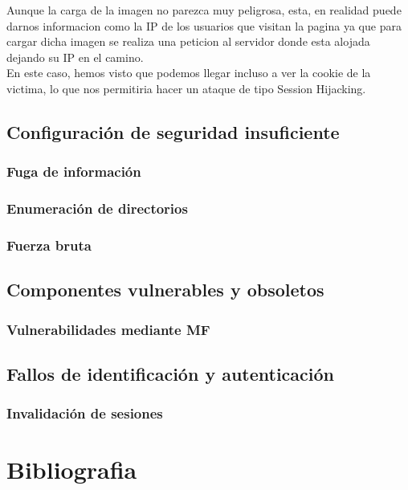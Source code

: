 \documentclass{report}
\begin{document}
                Aunque la carga de la imagen no parezca muy peligrosa, esta, en realidad puede darnos informacion como la IP de los usuarios que visitan la pagina ya que para cargar dicha imagen se realiza una peticion al servidor donde esta alojada dejando su IP en el camino.\\

                En este caso, hemos visto que podemos llegar incluso a ver la cookie de la victima, lo que nos permitiria hacer un ataque de tipo Session Hijacking.\\
                
                \clearpage
        \section{Configuración de seguridad insuficiente}
            \subsection{Fuga de información}
            \clearpage
            \subsection{Enumeración de directorios}
            \clearpage
            \subsection{Fuerza bruta}
            \clearpage
        \section{Componentes vulnerables y obsoletos}
            \subsection{Vulnerabilidades mediante MF}
            \clearpage
        \section{Fallos de identificación y autenticación}
            \subsection{Invalidación de sesiones}
            \clearpage
    \chapter{Bibliografia}
\end{document}
